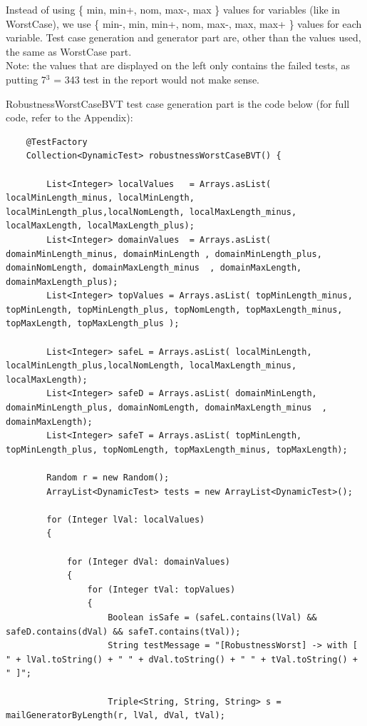 \documentclass[a4paper,9pt,oneside]{scrreprt}
\begin{document}
\begin{enumerate}[a)]
\begin{paracol}{2}
			\switchcolumn
			
			Instead of using \{ min, min+, nom, max-, max \} values for variables (like in WorstCase), we use \{ min-, min, min+, nom, max-, max, max+ \} values for each variable. Test case generation and generator part are, other than the values used, the same as WorstCase part.\\
			
			Note: the values that are displayed on the left only contains the failed tests, as putting 7$^{3}$ = 343 test in the report would not make sense.
		\end{paracol}
		\clearpage
		
RobustnessWorstCaseBVT test case generation part is the code below (for full code, refer to the Appendix):
\begin{lstlisting}
	@TestFactory
	Collection<DynamicTest> robustnessWorstCaseBVT() {
	
		List<Integer> localValues	= Arrays.asList( localMinLength_minus, localMinLength, localMinLength_plus,localNomLength, localMaxLength_minus, localMaxLength, localMaxLength_plus);
		List<Integer> domainValues	= Arrays.asList( domainMinLength_minus, domainMinLength	, domainMinLength_plus, domainNomLength, domainMaxLength_minus	, domainMaxLength, domainMaxLength_plus);
		List<Integer> topValues	= Arrays.asList( topMinLength_minus, topMinLength, topMinLength_plus, topNomLength, topMaxLength_minus, topMaxLength, topMaxLength_plus );
		
		List<Integer> safeL	= Arrays.asList( localMinLength, localMinLength_plus,localNomLength, localMaxLength_minus, localMaxLength);
		List<Integer> safeD	= Arrays.asList( domainMinLength, domainMinLength_plus, domainNomLength, domainMaxLength_minus	, domainMaxLength);
		List<Integer> safeT	= Arrays.asList( topMinLength, topMinLength_plus, topNomLength, topMaxLength_minus, topMaxLength);
		
		Random r = new Random();
		ArrayList<DynamicTest> tests = new ArrayList<DynamicTest>();
		
		for (Integer lVal: localValues) 
		{
			
			for (Integer dVal: domainValues) 
			{    			
				for (Integer tVal: topValues) 
				{
					Boolean isSafe = (safeL.contains(lVal) && safeD.contains(dVal) && safeT.contains(tVal));
					String testMessage = "[RobustnessWorst] -> with [ " + lVal.toString() + " " + dVal.toString() + " " + tVal.toString() + " ]";
					
					Triple<String, String, String> s = mailGeneratorByLength(r, lVal, dVal, tVal);
					

\end{lstlisting}
\end{enumerate}
\end{document}
